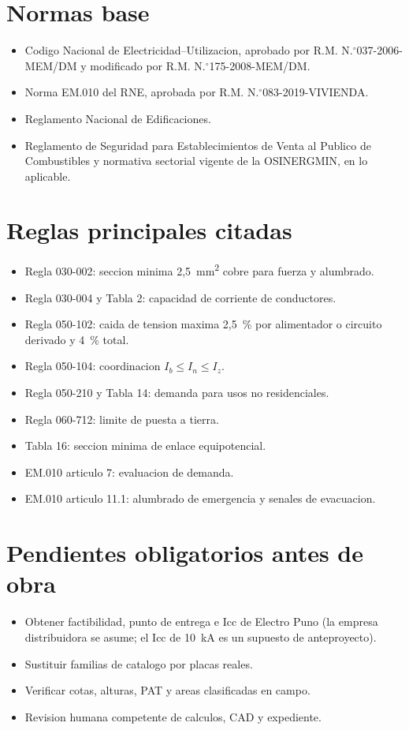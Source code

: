 \section{Normas base}
\begin{itemize}
\item Codigo Nacional de Electricidad--Utilizacion, aprobado por R.M. N.\({}^\circ\)037-2006-MEM/DM y modificado por R.M. N.\({}^\circ\)175-2008-MEM/DM.
\item Norma EM.010 del RNE, aprobada por R.M. N.\({}^\circ\)083-2019-VIVIENDA.
\item Reglamento Nacional de Edificaciones.
\item Reglamento de Seguridad para Establecimientos de Venta al Publico de Combustibles y normativa sectorial vigente de la OSINERGMIN, en lo aplicable.
\end{itemize}

\section{Reglas principales citadas}
\begin{itemize}
\item Regla 030-002: seccion minima 2,5~mm\textsuperscript{2} cobre para fuerza y alumbrado.
\item Regla 030-004 y Tabla 2: capacidad de corriente de conductores.
\item Regla 050-102: caida de tension maxima 2,5~\% por alimentador o circuito derivado y 4~\% total.
\item Regla 050-104: coordinacion \(I_b \leq I_n \leq I_z\).
\item Regla 050-210 y Tabla 14: demanda para usos no residenciales.
\item Regla 060-712: limite de puesta a tierra.
\item Tabla 16: seccion minima de enlace equipotencial.
\item EM.010 articulo 7: evaluacion de demanda.
\item EM.010 articulo 11.1: alumbrado de emergencia y senales de evacuacion.
\end{itemize}

\section{Pendientes obligatorios antes de obra}
\begin{itemize}
\item Obtener factibilidad, punto de entrega e Icc de Electro Puno (la empresa
      distribuidora se asume; el Icc de 10~kA es un supuesto de anteproyecto).
\item Sustituir familias de catalogo por placas reales.
\item Verificar cotas, alturas, PAT y areas clasificadas en campo.
\item Revision humana competente de calculos, CAD y expediente.
\end{itemize}
